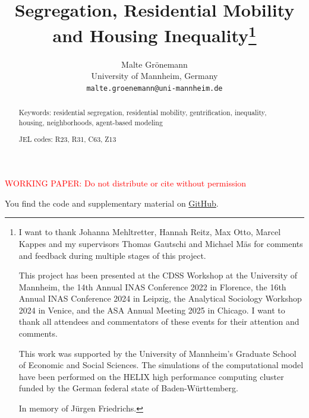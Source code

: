 \documentclass[a4paper,12pt]{article}
\title{Segregation, Residential Mobility and Housing Inequality\footnote{
I want to thank Johanna Mehltretter, Hannah Reitz, Max Otto, Marcel Kappes and my supervisors Thomas Gautschi and Michael Mäs for comments and feedback during multiple stages of this project.

This project has been presented at the CDSS Workshop at the University of Mannheim, the 14th Annual INAS Conference 2022 in Florence, the 16th Annual INAS Conference 2024 in Leipzig, the Analytical Sociology Workshop 2024 in Venice, and the ASA Annual Meeting 2025 in Chicago. I want to thank all attendees and commentators of these events for their attention and comments.

This work was supported by the University of Mannheim’s Graduate School of Economic and Social Sciences. The simulations of the computational model have been performed on the HELIX high performance computing cluster funded by the German federal state of Baden-Württemberg.

In memory of Jürgen Friedrichs.}}
\author{Malte Grönemann \\ University of Mannheim, Germany \\ \texttt{malte.groenemann@uni-mannheim.de}}
\begin{document}
\maketitle

\textcolor{red}{WORKING PAPER: Do not distribute or cite without permission}

You find the code and supplementary material on \href{https://github.com/maltegroenemann/soc-econ-housing}{GitHub}.

\begin{abstract} 


Keywords: residential segregation, residential mobility, gentrification, inequality, housing, neighborhoods, agent-based modeling

JEL codes: R23, R31, C63, Z13
\end{abstract}


\newpage























\singlespacing
\printbibliography
\end{document}
